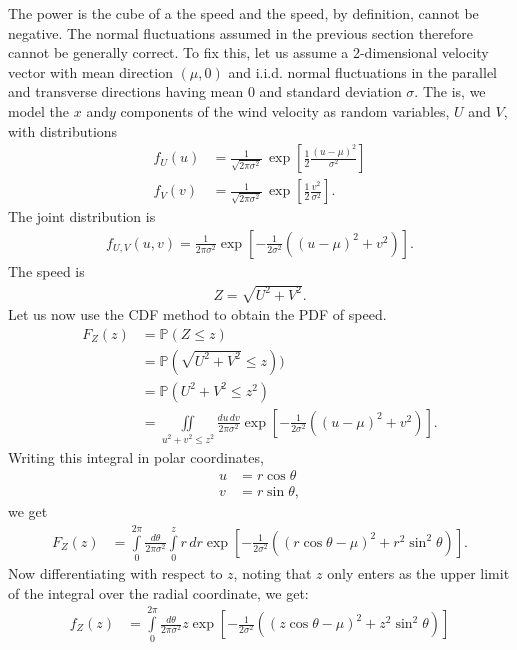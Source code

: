 \documentclass[11pt]{article}
\begin{document}
\begin{multicols}{2}
 The power is the cube of a the speed and the speed, by definition, cannot be negative. 
 The normal fluctuations assumed in the previous section therefore cannot be generally correct. 
 To fix this, let us assume a 2-dimensional velocity vector with mean direction $(\mu, 0)$ and i.i.d. normal fluctuations in the parallel and transverse directions having mean $0$ and standard deviation $\sigma$.
 The is, we model the $x$ and$y$ components of the wind velocity as random variables, $U$ and $V$, with distributions
 \begin{align*}
 f_U(u) &= \frac{1}{\sqrt{2 \pi \sigma^2}} \, \exp \left[ \frac{1}{2} \frac{(u-\mu)^2}{\sigma^2}\right]\\
 f_V(v) &= \frac{1}{\sqrt{2 \pi \sigma^2}} \, \exp \left[ \frac{1}{2} \frac{v^2}{\sigma^2}\right].
 \end{align*}
 The joint distribution is 
 \begin{align*}
 f_{U,V}(u,v) = \frac{1}{2 \pi \sigma^2} \exp \left[ -\frac{1}{2 \sigma^2} \left( (u-\mu)^2 + v^2\right)\right].
 \end{align*}
 The speed is 
 \begin{align*}
 Z = \sqrt{U^2 + V^2}.
 \end{align*}
 Let us now use the CDF method to obtain the PDF of speed.
 \begin{align*}
 F_Z(z) &= \mathbb{P}(Z \leq z)\\
&= \mathbb{P}\left(\sqrt{U^2 + V^2} \leq z\right))\\
&= \mathbb{P}\left(U^2 + V^2 \leq z^2\right)\\
&= \iint \limits_{u^2+v^2 \leq z^2}  \frac{du\, dv}{2 \pi \sigma^2} \exp \left[ -\frac{1}{2 \sigma^2} \left( (u-\mu)^2 + v^2\right)\right].
 \end{align*}
 Writing this integral in polar coordinates,
 \begin{align*}
 u &= r \cos \theta\\
 v & = r \sin \theta,
 \end{align*}
 we get
 \begin{align*}
  F_Z(z) &= \!\! \int \limits_{0}^{2 \pi} \!\! \frac{d\theta}{2\pi\sigma^2} \int \limits_{0}^{z}\!\! r\, dr  \exp \left[ -\frac{1}{2 \sigma^2} \left( (r \cos \theta -\mu)^2 + r^2 \sin^2 \theta\right)\right].
 \end{align*}
 Now differentiating with respect to $z$, noting that $z$ only enters as the upper limit of the integral over the radial coordinate, we get:
 \begin{align*}
 f_Z(z) &=   \int \limits_{0}^{2 \pi}  \frac{d\theta}{2\pi\sigma^2}  z \exp \left[ -\frac{1}{2 \sigma^2} \left( (z \cos \theta -\mu)^2 + z^2 \sin^2 \theta\right)\right]\\

\end{align*}
\end{multicols}
\end{document}
